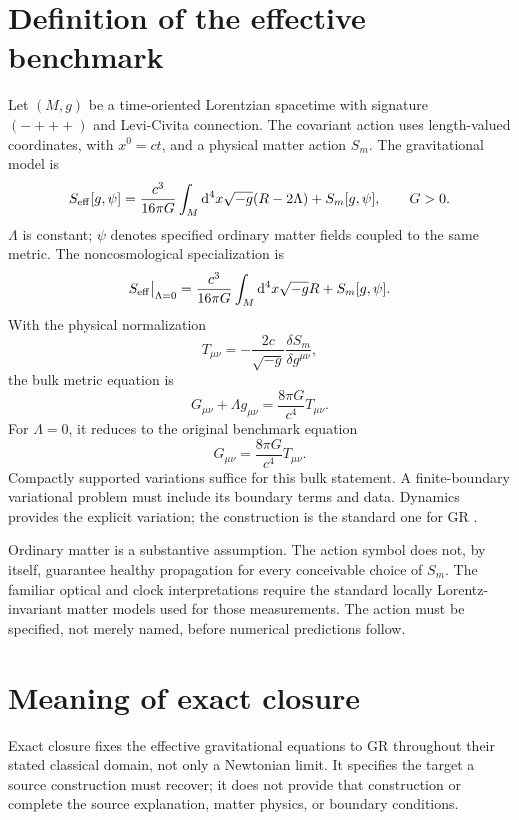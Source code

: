 \documentclass[11pt]{article}
\begin{document}
\section{Definition of the effective benchmark}
Let $(M,g)$ be a time-oriented Lorentzian spacetime with signature $(-+++)$ and Levi-Civita connection. The covariant action uses length-valued coordinates, with $x^0=ct$, and a physical matter action $S_m$. The gravitational model is
\begin{equation}
S_{\rm eff}[g,\psi]=\frac{c^3}{16\pi G}\int_M\mathrm d^4x\sqrt{-g}(R-2\Lambda)
+S_m[g,\psi],\qquad G>0.
\label{eq:SA_lambda_note}
\end{equation}
$\Lambda$ is constant; $\psi$ denotes specified ordinary matter fields coupled to the same metric. The noncosmological specialization is
\begin{equation}
S_{\rm eff}\big|_{\Lambda=0}=\frac{c^3}{16\pi G}
\int_M\mathrm d^4x\sqrt{-g}R+S_m[g,\psi].
\label{eq:SA}
\end{equation}
With the physical normalization
\begin{equation}
T_{\mu\nu}=-\frac{2c}{\sqrt{-g}}\frac{\delta S_m}{\delta g^{\mu\nu}},
\end{equation}
the bulk metric equation is
\begin{equation}
G_{\mu\nu}+\Lambda g_{\mu\nu}=\frac{8\pi G}{c^4}T_{\mu\nu}.
\label{eq:einstein_lambda_note}
\end{equation}
For $\Lambda=0$, it reduces to the original benchmark equation
\begin{equation}
G_{\mu\nu}=\frac{8\pi G}{c^4}T_{\mu\nu}.
\label{eq:einstein}
\end{equation}
Compactly supported variations suffice for this bulk statement. A finite-boundary variational problem must include its boundary terms and data. Dynamics provides the explicit variation; the construction is the standard one for GR \parencite{Carroll1997}.

Ordinary matter is a substantive assumption. The action symbol does not, by itself, guarantee healthy propagation for every conceivable choice of $S_m$. The familiar optical and clock interpretations require the standard locally Lorentz-invariant matter models used for those measurements. The action must be specified, not merely named, before numerical predictions follow.

\section{Meaning of exact closure}
Exact closure fixes the effective gravitational equations to GR throughout their stated classical domain, not only a Newtonian limit. It specifies the target a source construction must recover; it does not provide that construction or complete the source explanation, matter physics, or boundary conditions.
\end{document}
